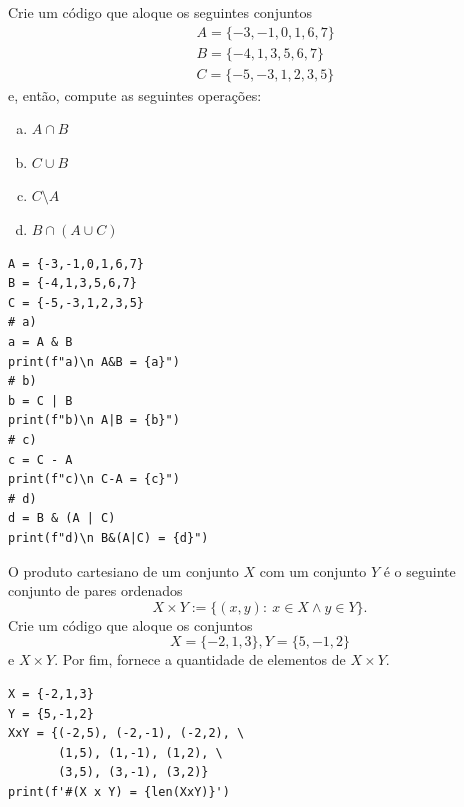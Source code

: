 \begin{exer}
  Crie um código que aloque os seguintes conjuntos
  \begin{align}
    & A = \{-3,-1,0,1,6,7\} \\
    & B = \{-4,1,3,5,6,7\} \\
    & C = \{-5,-3,1,2,3,5\}
  \end{align}
  e, então, compute as seguintes operações:
  \begin{enumerate}[a)]
  \item $A\cap B$\\
  \item $C\cup B$\\
  \item $C\setminus A$\\
  \item $B\cap (A\cup C)$
  \end{enumerate}
\end{exer}
\begin{resp}

\begin{lstlisting}
A = {-3,-1,0,1,6,7}
B = {-4,1,3,5,6,7}
C = {-5,-3,1,2,3,5}
# a)
a = A & B
print(f"a)\n A&B = {a}")
# b)
b = C | B
print(f"b)\n A|B = {b}")
# c)
c = C - A
print(f"c)\n C-A = {c}")
# d)
d = B & (A | C)
print(f"d)\n B&(A|C) = {d}")
\end{lstlisting}

\end{resp}

\begin{exer}
  O produto cartesiano{\descartes} de um conjunto $X$ com um conjunto $Y$ é o seguinte conjunto de pares ordenados
  \begin{equation}
    X\times Y := \{(x,y):~x\in X \land y\in Y\}.
  \end{equation}
  Crie um código que aloque os conjuntos
  \begin{equation}
    X = \{-2,1,3\},
    Y = \{5,-1,2\}
  \end{equation}
  e $X\times Y$. Por fim, fornece a quantidade de elementos de $X\times Y$.
\end{exer}
\begin{resp}

\begin{lstlisting}
X = {-2,1,3}
Y = {5,-1,2}
XxY = {(-2,5), (-2,-1), (-2,2), \
       (1,5), (1,-1), (1,2), \
       (3,5), (3,-1), (3,2)}
print(f'#(X x Y) = {len(XxY)}')
\end{lstlisting}

\end{resp}

